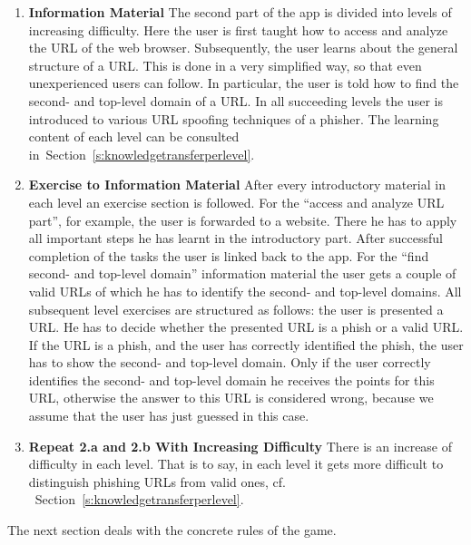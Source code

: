 \begin{enumerate}
\begin{enumerate}
	\item \textbf{Information Material} The second part of the app is divided into levels of increasing difficulty.
 Here the user is first taught how to access and analyze the URL of the web browser.
 Subsequently, the user learns about the general structure of a URL.
 This is done in a very simplified way, so that even unexperienced users can follow.
 In particular, the user is told how to find the second- and top-level domain of a URL.
 In all succeeding levels the user is introduced to various URL spoofing techniques of a phisher.
 The learning content of each level can be consulted in~Section~\ref{s:knowledgetransferperlevel}.
		\item \textbf{Exercise to Information Material} After every introductory material in each level an exercise section is followed.
 For the ``access and analyze URL part'', for example, the user is forwarded to a website.
 There he has to apply all important steps he has learnt in the introductory part.
 After successful completion of the tasks the user is linked back to the app.
 For the ``find second- and top-level domain'' information material the user gets a couple of valid URLs of which he has to identify the second- and top-level domains.
 All subsequent level exercises are structured as follows: the user is presented a URL.
 He has to decide whether the presented URL is a phish or a valid URL.
 If the URL is a phish, and the user has correctly identified the phish, the user has to show the second- and top-level domain.
 Only if the user correctly identifies the second- and top-level domain he receives the points for this URL, otherwise the answer to this URL is considered wrong, because we assume that the user has just guessed in this case.

		\item \textbf{Repeat 2.a and 2.b With Increasing Difficulty} There is an increase of difficulty in each level.
 That is to say, in each level it gets more difficult to distinguish phishing URLs from valid ones, cf.
~Section~\ref{s:knowledgetransferperlevel}.
\end{enumerate}
\end{enumerate}

The next section deals with the concrete rules of the game.

